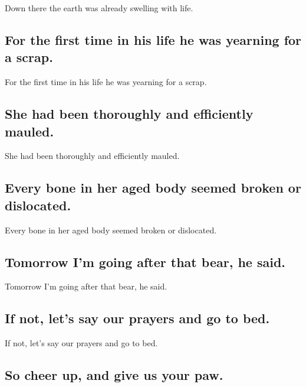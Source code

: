 \documentclass[]{article}
\begin{document}
Down there the earth was already swelling with life.

\hypertarget{for-the-first-time-in-his-life-he-was-yearning-for-a-scrap.}{%
\subsection{For the first time in his life he was yearning for a
scrap.}\label{for-the-first-time-in-his-life-he-was-yearning-for-a-scrap.}}

For the first time in his life he was yearning for a scrap.

\hypertarget{she-had-been-thoroughly-and-efficiently-mauled.}{%
\subsection{She had been thoroughly and efficiently
mauled.}\label{she-had-been-thoroughly-and-efficiently-mauled.}}

She had been thoroughly and efficiently mauled.

\hypertarget{every-bone-in-her-aged-body-seemed-broken-or-dislocated.}{%
\subsection{Every bone in her aged body seemed broken or
dislocated.}\label{every-bone-in-her-aged-body-seemed-broken-or-dislocated.}}

Every bone in her aged body seemed broken or dislocated.

\hypertarget{tomorrow-im-going-after-that-bear-he-said.}{%
\subsection{Tomorrow I'm going after that bear, he
said.}\label{tomorrow-im-going-after-that-bear-he-said.}}

Tomorrow I'm going after that bear, he said.

\hypertarget{if-not-lets-say-our-prayers-and-go-to-bed.}{%
\subsection{If not, let's say our prayers and go to
bed.}\label{if-not-lets-say-our-prayers-and-go-to-bed.}}

If not, let's say our prayers and go to bed.

\hypertarget{so-cheer-up-and-give-us-your-paw.}{%
\subsection{So cheer up, and give us your
paw.}\label{so-cheer-up-and-give-us-your-paw.}}
\end{document}
